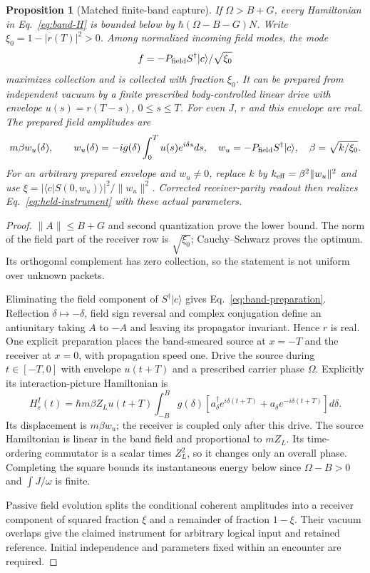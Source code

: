 \documentclass[aps,pre,onecolumn,superscriptaddress,floatfix,longbibliography]{revtex4-2}
\newtheorem{proposition}[theorem]{Proposition}
\begin{document}
\begin{proposition}[Matched finite-band capture]
\label{prop:band-capture}
If $\Omega>B+G$, every Hamiltonian in Eq.~\eqref{eq:band-H} is bounded
below by $\hbar(\Omega-B-G)N$. Write
$\xi_0=1-|r(T)|^2>0$. Among normalized incoming field modes, the mode
\[
 f=-P_{\rm field}S^\dagger|c\rangle/\sqrt{\xi_0}
\]
maximizes collection and is collected with fraction $\xi_0$.
It can be prepared from independent vacuum by a finite prescribed
body-controlled linear drive with envelope $u(s)=r(T-s)$, $0\le s\le T$.
For even $J$, $r$ and this envelope are real. The prepared field amplitudes are
\begin{equation}
 m\beta w_u(\delta),\qquad
 w_u(\delta)=-ig(\delta)\int_0^T u(s)e^{i\delta s}ds,
 \quad w_u=-P_{\rm field}S^\dagger|c\rangle,
 \quad \beta=\sqrt{k/\xi_0}.
 \label{eq:band-preparation}
\end{equation}
For an arbitrary prepared envelope and $w_u\ne0$, replace $k$ by
$k_{\rm eff}=\beta^2\|w_u\|^2$ and use
$\xi=|\langle c|S(0,w_u)\rangle|^2/\|w_u\|^2$.
Corrected receiver-parity readout then realizes
Eq.~\eqref{eq:held-instrument} with these actual parameters.
\end{proposition}
\begin{proof}
$\|A\|\le B+G$ and second quantization prove the lower bound.
The norm of the field part of the receiver row is $\sqrt{\xi_0}$;
Cauchy--Schwarz proves the optimum. Its orthogonal complement has zero
collection, so the statement is not uniform over unknown packets.

Eliminating the field component of $S^\dagger|c\rangle$ gives
Eq.~\eqref{eq:band-preparation}. Reflection $\delta\mapsto-\delta$,
field sign reversal and complex conjugation define an antiunitary taking
$A$ to $-A$ and leaving its propagator invariant. Hence $r$ is real.
One explicit preparation places the band-smeared source at $x=-T$ and the
receiver at $x=0$, with propagation speed one. Drive the source during
$t\in[-T,0]$ with envelope $u(t+T)$ and a prescribed carrier phase
$\Omega$. Explicitly its interaction-picture Hamiltonian is
\[
 H_s^I(t)=\hbar m\beta Z_L u(t+T)
 \int_{-B}^B g(\delta)
 [a_\delta^\dagger e^{i\delta(t+T)}+
  a_\delta e^{-i\delta(t+T)}]d\delta.
\]
Its displacement is $m\beta w_u$; the receiver is coupled only after this
drive. The source Hamiltonian is linear in the band field and proportional
to $mZ_L$. Its time-ordering
commutator is a scalar times $Z_L^2$, so it changes only an overall phase.
Completing the square bounds its instantaneous energy below since
$\Omega-B>0$ and $\int J/\omega$ is finite.

Passive field evolution splits the conditional coherent amplitudes into
a receiver component of squared fraction $\xi$ and a remainder of
fraction $1-\xi$. Their vacuum overlaps give the claimed instrument for
arbitrary logical input and retained reference. Initial independence and
parameters fixed within an encounter are required.
\end{proof}
\end{document}
